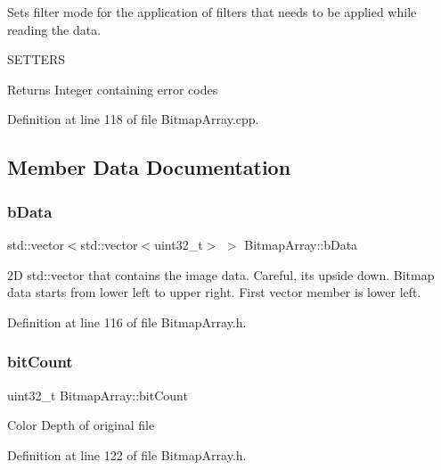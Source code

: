 Sets filter mode for the application of filters that needs to be applied while reading the data. 

S\+E\+T\+T\+E\+RS\begin{DoxyReturn}{Returns}
Integer containing error codes 
\end{DoxyReturn}


Definition at line 118 of file Bitmap\+Array.\+cpp.



\subsection{Member Data Documentation}
\mbox{\label{classBitmapArray_a4af158b9be17ce7ebeab8729c2b34ab2}} 
\subsubsection{\texorpdfstring{bData}{bData}}
{\footnotesize\ttfamily std\+::vector$<$std\+::vector$<$uint32\+\_\+t$>$ $>$ Bitmap\+Array\+::b\+Data\hspace{0.3cm}{\ttfamily [private]}}

2D std\+::vector that contains the image data. Careful, its upside down. Bitmap data starts from lower left to upper right. First vector member is lower left. 

Definition at line 116 of file Bitmap\+Array.\+h.

\mbox{\label{classBitmapArray_a18127e27d4b1477fd46ef0c0b3dbc110}} 
\subsubsection{\texorpdfstring{bitCount}{bitCount}}
{\footnotesize\ttfamily uint32\+\_\+t Bitmap\+Array\+::bit\+Count\hspace{0.3cm}{\ttfamily [private]}}

Color Depth of original file 

Definition at line 122 of file Bitmap\+Array.\+h.

\mbox{\label{classBitmapArray_abcab200a1eb84331f7c79702e9199694}} 
